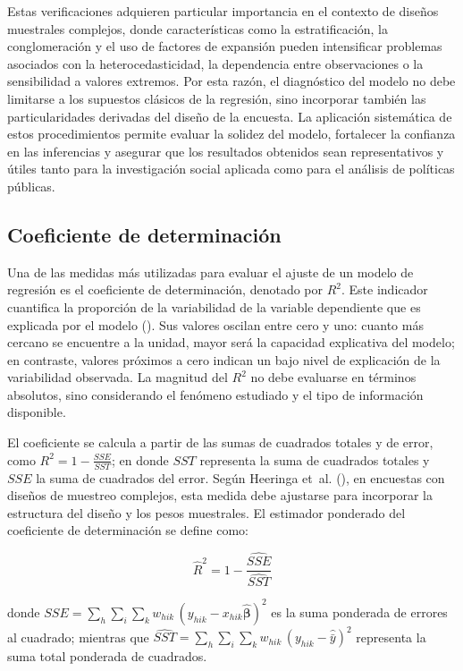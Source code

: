 \documentclass[
  spanish,
  11pt,
  letterpaper,
  oneside,
  open=any]{scrbook}
\begin{document}
Estas verificaciones adquieren particular importancia en el contexto de
diseños muestrales complejos, donde características como la
estratificación, la conglomeración y el uso de factores de expansión
pueden intensificar problemas asociados con la heterocedasticidad, la
dependencia entre observaciones o la sensibilidad a valores extremos.
Por esta razón, el diagnóstico del modelo no debe limitarse a los
supuestos clásicos de la regresión, sino incorporar también las
particularidades derivadas del diseño de la encuesta. La aplicación
sistemática de estos procedimientos permite evaluar la solidez del
modelo, fortalecer la confianza en las inferencias y asegurar que los
resultados obtenidos sean representativos y útiles tanto para la
investigación social aplicada como para el análisis de políticas
públicas.

\subsection{Coeficiente de
determinación}\label{coeficiente-de-determinacion}

Una de las medidas más utilizadas para evaluar el ajuste de un modelo de
regresión es el coeficiente de determinación, denotado por \(R^{2}\).
Este indicador cuantifica la proporción de la variabilidad de la
variable dependiente que es explicada por el modelo
(). Sus valores
oscilan entre cero y uno: cuanto más cercano se encuentre a la unidad,
mayor será la capacidad explicativa del modelo; en contraste, valores
próximos a cero indican un bajo nivel de explicación de la variabilidad
observada. La magnitud del \(R^{2}\) no debe evaluarse en términos
absolutos, sino considerando el fenómeno estudiado y el tipo de
información disponible.

El coeficiente se calcula a partir de las sumas de cuadrados totales y
de error, como \(R^{2} = 1 - \frac{SSE}{SST}\); en donde \(SST\)
representa la suma de cuadrados totales y \(SSE\) la suma de cuadrados
del error. Según Heeringa et~al.
(), en encuestas con
diseños de muestreo complejos, esta medida debe ajustarse para
incorporar la estructura del diseño y los pesos muestrales. El estimador
ponderado del coeficiente de determinación se define como:

\[
\hat{R}^2 = 1 - \frac{\widehat{SSE}}{\widehat{SST}}
\]

donde
\(\widehat{SSE} = \sum_{h} \sum_{i} \sum_{k} w_{hik} \,(y_{hik} - x_{hik}\hat{\boldsymbol{\beta}})^2\)
es la suma ponderada de errores al cuadrado; mientras que
\(\widehat{SST} = \sum_{h} \sum_{i} \sum_{k} w_{hik}\,(y_{hik} - \hat{\bar{y}})^2\)
representa la suma total ponderada de cuadrados.
\end{document}
